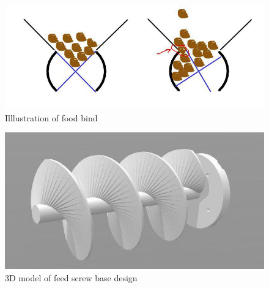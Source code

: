 \documentclass[12pt]{article}
\begin{document}
\begin{figure}[H]
\centering
\includegraphics[width=.5\textwidth]{bind}
\caption{Illlustration of food bind}
\label{figure:bind}
\end{figure}

\begin{figure}[H]
\centering
\includegraphics[width=.5\textwidth]{feed_screw}
\caption{3D model of feed screw base design}
\label{figure:feed_screw}
\end{figure}
\end{document}
